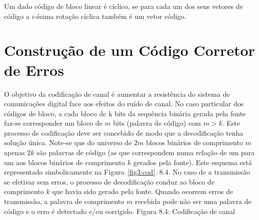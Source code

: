 \begin{definition} Um dado código de bloco linear é cíclico, se para cada um dos seus vetores de código a $i$-ésima rotação cíclica também é um vetor código.
\end{definition}


\section{Construção de um Código Corretor de Erros}





O objetivo da codificação de canal é aumentar a resistência do sistema de comunicações digital face aos efeitos do ruído de canal. No caso particular dos códigos de bloco, a cada bloco de k bits da sequência binária gerada pela fonte faz-se corresponder um bloco de $m$ bits (palavra de código) com $m > k$. Este processo de codificação deve ser concebido de modo que a decodificação tenha solução única. Note-se que do universo de $2m$ blocos binários de comprimento $m$ apenas $2k$ são palavras de código (as que correspondem numa relação de um para um aos blocos binários de comprimento $k$ gerados pela fonte). Este esquema está representado simbolicamente na Figura~\ref{fig3:cod}. 8.4. No caso de a transmissão se efetivar sem erros, o processo de decodificação conduz ao bloco de comprimento $k$ que havia sido gerado pela fonte. Quando ocorrem erros de transmissão, a palavra de comprimento $m$ recebida pode não ser uma palavra de código e o erro é detectado e/ou corrigido.
Figura 8.4: Codificação de canal

